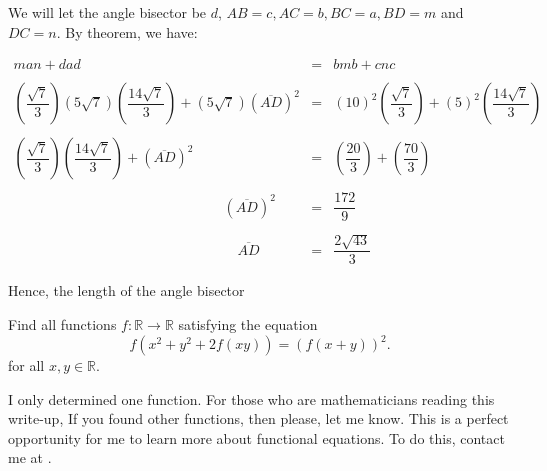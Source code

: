 \documentclass[12pt,paper=letter]{scrartcl}
\newenvironment{rem}%
{\noindent \ignorespaces \small \sffamily \sansmath {\bfseries Remark.}}%
{\ignorespacesafterend}
\begin{document}
We will let the angle bisector be $d$, $AB = c, AC=b, BC = a, BD = m$ and $DC=n$. By theorem, we have:

\vspace{-1em}

\begin{equation*}
\begin{array}{lll}

   man + dad & =  &  bmb + cnc \\
    
    \\
   \left(\dfrac{\sqrt{7}}{3}\right)\left(5\sqrt{7}\right)\left(\dfrac{14\sqrt{7}}{3}\right) + (5\sqrt{7})(\overline{AD})^2 & = & (10)^2\left(\dfrac{\sqrt{7}}{3}\right)+ (5)^2\left(\dfrac{14\sqrt{7}}{3}\right)\\
     
     \\
     
    \left(\dfrac{\sqrt{7}}{3}\right)\left(\dfrac{14\sqrt{7}}{3}\right) + (\overline{AD})^2 & = & \left(\dfrac{20}{3}\right)+ \left(\dfrac{70}{3}\right)\\
       
       \\
       
 \quad \qquad \qquad \qquad \qquad \qquad \qquad \qquad  (\overline{AD})^2 & = & \dfrac{172}{9}\\
        
        \\
        
  \quad \quad \qquad \qquad \qquad \qquad \qquad \qquad \qquad  \overline{AD} & = & \dfrac{2\sqrt{43}}{3}
      
\end{array}
   
\end{equation*}

\vspace{-2em}

\newpage

Hence, the length of the angle bisector 

\begin{probboxed}
Find all functions $f:\mathbb{R} \to \mathbb{R}$ satisfying the equation\[
	f(x^2+y^2+2f(xy)) = (f(x+y))^2.
\]for all $x,y \in \mathbb{R}$.
\end{probboxed}

\begin{rem}
I only determined one function. For those who are mathematicians reading this write-up, If you found other functions, then please, let me know. This is a perfect opportunity for me to learn more about functional equations. To do this, contact me at .
\end{rem}
\end{document}
